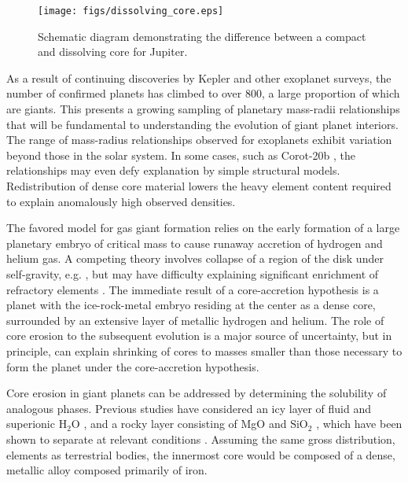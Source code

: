  \begin{figure}[h] %
   \centering
   \texttt{[image: figs/dissolving\_core.eps]} 
   \caption{Schematic diagram demonstrating the difference between a compact and dissolving core for Jupiter.\label{fig:dissolve_core}}
\end{figure}



As a result of continuing discoveries by Kepler \citep{Borucki2010} and other exoplanet surveys, the
number of confirmed planets has climbed to over 800, a large proportion of which are
giants. This presents a growing sampling of planetary
mass-radii relationships that will be fundamental to understanding the evolution of
giant planet interiors. The range of mass-radius relationships observed for
exoplanets exhibit variation beyond those in the solar system. In some cases,
such as Corot-20b \citep{deleuil2011}, the relationships may even defy explanation by
simple structural models. Redistribution of dense core material lowers the
heavy element content required to explain anomalously high observed densities.

The favored model for gas giant formation
\citep{Mizuno1978,Bodenheimer1986,Pollack1996} relies on the early
formation of a large planetary embryo of critical mass to cause runaway
accretion of hydrogen and helium gas. A competing theory involves collapse of
a region of the disk under self-gravity, e.g. \citep{Boss1997}, but may
have difficulty explaining significant enrichment of refractory elements \citep{Hubbard2002,Guillot2005}.
The immediate result of a core-accretion hypothesis is a planet with the
ice-rock-metal embryo residing at the center as a dense core, surrounded by an
extensive layer of metallic hydrogen and helium. The role of core erosion to
the subsequent evolution is a major source of uncertainty, but in principle, can explain shrinking of
cores to masses smaller than those necessary to form the planet under the
core-accretion hypothesis.

Core erosion in giant planets can be addressed by determining the solubility 
of analogous phases. Previous studies have considered an icy
layer of fluid and superionic $\mathrm{H}_2\mathrm{O}$
\citep{Wilson2012a,Wilson2013}, and a rocky layer consisting of
MgO \citep{wilson12b} and $\mathrm{SiO}_2$ \citep{Gonzalez2013}, which have been
shown to separate at relevant conditions \citep{umemoto2006}. Assuming the
same gross distribution, elements as terrestrial bodies, the innermost core
would be composed of a dense, metallic alloy composed primarily of iron.

